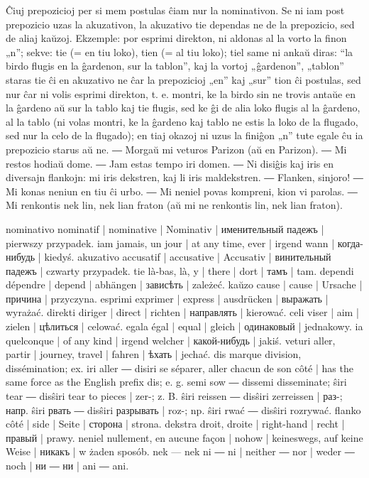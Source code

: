 Ĉiuj prepozicioj per si mem postulas ĉiam nur la nominativon. Se ni iam post prepozicio uzas la akuzativon, la akuzativo tie dependas ne de la prepozicio, sed de aliaj kaŭzoj. Ekzemple: por esprimi direkton, ni aldonas al la vorto la finon „n”; sekve: tie (= en tiu loko), tien (= al tiu loko); tiel same ni ankaŭ diras: “la birdo flugis en la ĝardenon, sur la tablon”, kaj la vortoj „ĝardenon”, „tablon” staras tie ĉi en akuzativo ne ĉar la prepozicioj „en” kaj „sur” tion ĉi postulas, sed nur ĉar ni volis esprimi direkton, t. e. montri, ke la birdo sin ne trovis antaŭe en la ĝardeno aŭ sur la tablo kaj tie flugis, sed ke ĝi de alia loko flugis al la ĝardeno, al la tablo (ni volas montri, ke la ĝardeno kaj tablo ne estis la loko de la flugado, sed nur la celo de la flugado); en tiaj okazoj ni uzus la finiĝon „n” tute egale ĉu ia prepozicio starus aŭ ne. ― Morgaŭ mi veturos Parizon (aŭ en Parizon). ― Mi restos hodiaŭ dome. ― Jam estas tempo iri domen. ― Ni disiĝis kaj iris en diversajn flankojn: mi iris dekstren, kaj li iris maldekstren. ― Flanken, sinjoro! ― Mi konas neniun en tiu ĉi urbo. ― Mi neniel povas kompreni, kion vi parolas. ― Mi renkontis nek lin, nek lian fraton (aŭ mi ne renkontis lin, nek lian fraton).

nominativo nominatif | nominative | Nominativ | именительный падежъ | pierwszy przypadek.
iam jamais, un jour | at any time, ever | irgend wann | когда-нибудь | kiedyś.
akuzativo accusatif | accusative | Accusativ | винительный падежъ | czwarty przypadek.
tie là-bas, là, y | there | dort | тамъ | tam.
dependi dépendre | depend | abhängen | зависѣть | zależeć.
kaŭzo cause | cause | Ursache | причина | przyczyna.
esprimi exprimer | express | ausdrücken | выражать | wyrażać.
direkti diriger | direct | richten | направлять | kierować.
celi viser | aim | zielen | цѣлиться | celować.
egala égal | equal | gleich | одинаковый | jednakowy.
ia quelconque | of any kind | irgend welcher | какой-нибудь | jakiś.
veturi aller, partir | journey, travel | fahren | ѣхать | jechać.
dis marque division, dissémination; ex. iri aller ― disiri se séparer, aller chacun de son côté | has the same force as the English prefix dis; e. g. semi sow ― dissemi disseminate; ŝiri tear ― disŝiri tear to pieces | zer-; z. B. ŝiri reissen ― disŝiri zerreissen | раз-; напр. ŝiri рвать ― disŝiri разрывать | roz-; np. ŝiri rwać ― disŝiri rozrywać.
flanko côté | side | Seite | сторона | strona.
dekstra droit, droite | right-hand | recht | правый | prawy.
neniel nullement, en aucune façon | nohow | keineswegs, auf keine Weise | никакъ | w żaden sposób.
nek --- nek ni ― ni | neither ― nor | weder ― noch | ни ― ни | ani ― ani.

